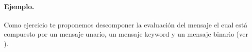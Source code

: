 \documentclass[a4paper,10pt,twoside]{book}
\begin{document}




\paragraph{Ejemplo.} Como ejercicio te proponemos descomponer la evaluaci\'on del mensaje  el cual est\'a compuesto por un mensaje unario, un mensaje keyword y un mensaje binario (ver ).

\end{document}
